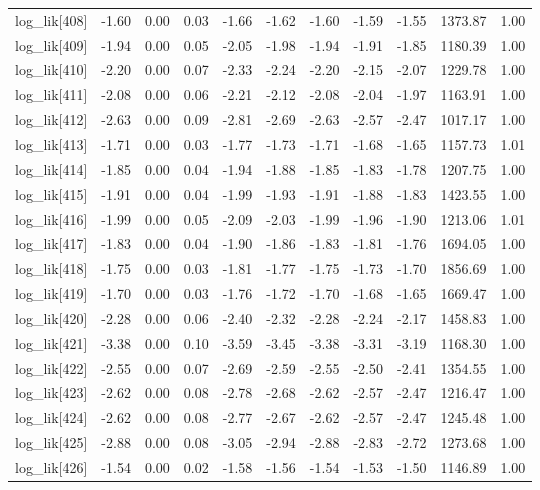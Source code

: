 \begin{table}[ht]
\begin{tabular}{rrrrrrrrrrr}
  log\_lik[408] & -1.60 & 0.00 & 0.03 & -1.66 & -1.62 & -1.60 & -1.59 & -1.55 & 1373.87 & 1.00 \\ 
  log\_lik[409] & -1.94 & 0.00 & 0.05 & -2.05 & -1.98 & -1.94 & -1.91 & -1.85 & 1180.39 & 1.00 \\ 
  log\_lik[410] & -2.20 & 0.00 & 0.07 & -2.33 & -2.24 & -2.20 & -2.15 & -2.07 & 1229.78 & 1.00 \\ 
  log\_lik[411] & -2.08 & 0.00 & 0.06 & -2.21 & -2.12 & -2.08 & -2.04 & -1.97 & 1163.91 & 1.00 \\ 
  log\_lik[412] & -2.63 & 0.00 & 0.09 & -2.81 & -2.69 & -2.63 & -2.57 & -2.47 & 1017.17 & 1.00 \\ 
  log\_lik[413] & -1.71 & 0.00 & 0.03 & -1.77 & -1.73 & -1.71 & -1.68 & -1.65 & 1157.73 & 1.01 \\ 
  log\_lik[414] & -1.85 & 0.00 & 0.04 & -1.94 & -1.88 & -1.85 & -1.83 & -1.78 & 1207.75 & 1.00 \\ 
  log\_lik[415] & -1.91 & 0.00 & 0.04 & -1.99 & -1.93 & -1.91 & -1.88 & -1.83 & 1423.55 & 1.00 \\ 
  log\_lik[416] & -1.99 & 0.00 & 0.05 & -2.09 & -2.03 & -1.99 & -1.96 & -1.90 & 1213.06 & 1.01 \\ 
  log\_lik[417] & -1.83 & 0.00 & 0.04 & -1.90 & -1.86 & -1.83 & -1.81 & -1.76 & 1694.05 & 1.00 \\ 
  log\_lik[418] & -1.75 & 0.00 & 0.03 & -1.81 & -1.77 & -1.75 & -1.73 & -1.70 & 1856.69 & 1.00 \\ 
  log\_lik[419] & -1.70 & 0.00 & 0.03 & -1.76 & -1.72 & -1.70 & -1.68 & -1.65 & 1669.47 & 1.00 \\ 
  log\_lik[420] & -2.28 & 0.00 & 0.06 & -2.40 & -2.32 & -2.28 & -2.24 & -2.17 & 1458.83 & 1.00 \\ 
  log\_lik[421] & -3.38 & 0.00 & 0.10 & -3.59 & -3.45 & -3.38 & -3.31 & -3.19 & 1168.30 & 1.00 \\ 
  log\_lik[422] & -2.55 & 0.00 & 0.07 & -2.69 & -2.59 & -2.55 & -2.50 & -2.41 & 1354.55 & 1.00 \\ 
  log\_lik[423] & -2.62 & 0.00 & 0.08 & -2.78 & -2.68 & -2.62 & -2.57 & -2.47 & 1216.47 & 1.00 \\ 
  log\_lik[424] & -2.62 & 0.00 & 0.08 & -2.77 & -2.67 & -2.62 & -2.57 & -2.47 & 1245.48 & 1.00 \\ 
  log\_lik[425] & -2.88 & 0.00 & 0.08 & -3.05 & -2.94 & -2.88 & -2.83 & -2.72 & 1273.68 & 1.00 \\ 
  log\_lik[426] & -1.54 & 0.00 & 0.02 & -1.58 & -1.56 & -1.54 & -1.53 & -1.50 & 1146.89 & 1.00 \\ 

\end{tabular}
\end{table}
